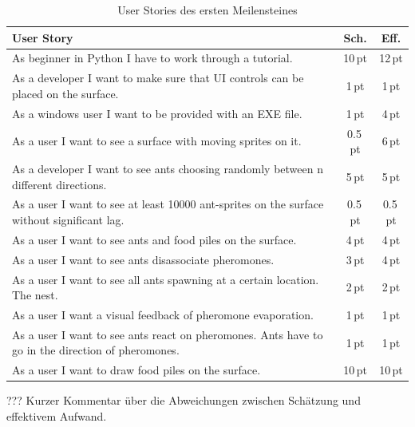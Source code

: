 \begin{table}[H]
\small\sffamily\renewcommand{\arraystretch}{1.5}
\begin{tabular}{| p{12cm} | c | c |}
  \hline
  \bfseries{User Story} & \bfseries{Sch.} & \bfseries{Eff.}  \\
  \hline
  As beginner in Python I have to work through a tutorial. & 10\,pt & 12\,pt \\
  \hline
  As a developer I want to make sure that UI controls can be placed on the surface. & 1\,pt &1\,pt \\
  \hline
  As a windows user I want to be provided with an EXE file. & 1\,pt &4\,pt \\
  \hline
  As a user I want to see a surface with moving sprites on it. & 0.5\,pt & 6\,pt \\
  \hline
  As a developer I want to see ants choosing randomly between n different directions. & 5\,pt & 5\,pt \\
  \hline
  As a user I want to see at least 10000 ant-sprites on the surface without significant lag. & 0.5\,pt & 0.5\,pt \\
  \hline
  As a user I want to see ants and food piles on the surface. & 4\,pt & 4\,pt \\
  \hline
  As a user I want to see ants disassociate pheromones. & 3\,pt & 4\,pt \\
  \hline
  As a user I want to see all ants spawning at a certain location. The nest. & 2\,pt & 2\,pt \\
  \hline
  As a user I want a visual feedback of pheromone evaporation. & 1\,pt & 1\,pt \\
  \hline
  As a user I want to see ants react on pheromones. Ants have to go in the direction of pheromones. & 1\,pt & 1\,pt \\
  \hline
  As a user I want to draw food piles on the surface. & 10\,pt & 10\,pt \\
  \hline
\end{tabular}
\captionsetup{type=table} %
\caption{User Stories des ersten Meilensteines}
\end{table}


\vspace*{0.5cm}


???
Kurzer Kommentar über die Abweichungen zwischen Schätzung und effektivem Aufwand. \\


\vspace*{1cm}



